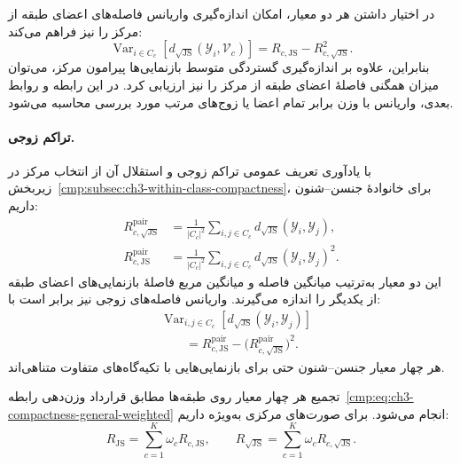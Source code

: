 در اختیار داشتن هر دو معیار، امکان اندازه‌گیری
واریانس فاصله‌های اعضای طبقه از مرکز را نیز فراهم
می‌کند:
\begin{equation}\label{cmp:eq:ch3-js-central-distance-variance}
\boxed{
\operatorname{Var}_{i\in C_c}
[d_{\sqrt{\mathrm{JS}}}(\mathscr Y_i,\mathcal V_c)]
=R_{c,\mathrm{JS}}-R_{c,\sqrt{\mathrm{JS}}}^{2}.
}
\end{equation}
بنابراین، علاوه بر اندازه‌گیری گستردگی متوسط
بازنمایی‌ها پیرامون مرکز، می‌توان میزان همگنی
فاصلهٔ اعضای طبقه از مرکز را نیز ارزیابی کرد.
در این رابطه و روابط بعدی، واریانس با وزن برابر
تمام اعضا یا زوج‌های مرتب مورد بررسی محاسبه می‌شود.

\paragraph{تراکم زوجی.}
با یادآوری تعریف عمومی تراکم زوجی و استقلال آن از
انتخاب مرکز در زیربخش~\ref{cmp:subsec:ch3-within-class-compactness}،
برای خانوادهٔ جنسن--شنون داریم:
\begin{equation}\label{cmp:eq:ch3-R-JS-pair-general}
\begin{aligned}
R_{c,\sqrt{\mathrm{JS}}}^{\mathrm{pair}}
&=\frac1{|C_c|^2}\sum_{i,j\in C_c}
d_{\sqrt{\mathrm{JS}}}(\mathscr Y_i,\mathscr Y_j),\\
R_{c,\mathrm{JS}}^{\mathrm{pair}}
&=\frac1{|C_c|^2}\sum_{i,j\in C_c}
d_{\sqrt{\mathrm{JS}}}(\mathscr Y_i,\mathscr Y_j)^2.
\end{aligned}
\end{equation}
این دو معیار به‌ترتیب میانگین فاصله و میانگین مربع
فاصلهٔ بازنمایی‌های اعضای طبقه از یکدیگر را اندازه
می‌گیرند. واریانس فاصله‌های زوجی نیز برابر است با:
\begin{equation}\label{cmp:eq:ch3-js-pair-distance-variance}
\boxed{\begin{aligned}
&\operatorname{Var}_{i,j\in C_c}
[d_{\sqrt{\mathrm{JS}}}(\mathscr Y_i,\mathscr Y_j)]\\
&\qquad=R_{c,\mathrm{JS}}^{\mathrm{pair}}
-\bigl(R_{c,\sqrt{\mathrm{JS}}}^{\mathrm{pair}}\bigr)^2.
\end{aligned}}
\end{equation}
هر چهار معیار جنسن--شنون حتی برای بازنمایی‌هایی با
تکیه‌گاه‌های متفاوت متناهی‌اند.

تجمیع هر چهار معیار روی طبقه‌ها مطابق قرارداد وزن‌دهی
رابطه~\eqref{cmp:eq:ch3-compactness-general-weighted}
انجام می‌شود. برای صورت‌های مرکزی به‌ویژه داریم:
\begin{equation}\label{cmp:eq:ch3-R-JS-forms}
R_{\mathrm{JS}}=\sum_{c=1}^K\omega_c R_{c,\mathrm{JS}},
\qquad
R_{\sqrt{\mathrm{JS}}}=\sum_{c=1}^K\omega_c R_{c,\sqrt{\mathrm{JS}}}.
\end{equation}

